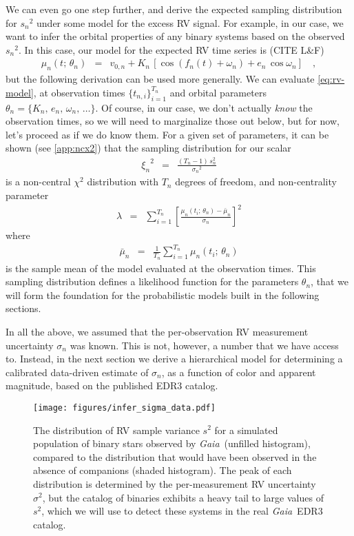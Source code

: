 \documentclass[modern, letterpaper]{aastex631}
\newcommand{\project}[1]{\textsl{#1}}
\newcommand{\Gaia}{\project{Gaia}}
\begin{document}
We can even go one step further, and derive the expected sampling distribution for ${s_n}^2$ under some model for the excess RV signal.
For example, in our case, we want to infer the orbital properties of any binary systems based on the observed ${s_n}^2$.
In this case, our model for the expected RV time series is (CITE L\&F)
\begin{eqnarray}
	\mu_n(t;\,\theta_n) &=& v_{0,n} + K_n\,\left[\cos(f_n(t) + \omega_n) + e_n\,\cos \omega_n\right] \quad,
	\label{eq:rv-model}
\end{eqnarray}
but the following derivation can be used more generally.
We can evaluate \autoref{eq:rv-model}, at observation times $\{t_{n,i}\}_{i=1}^{T_n}$ and orbital parameters $\theta_n=\{K_n,\,e_n,\,\omega_n,\,\ldots\}$.
Of course, in our case, we don't actually \emph{know} the observation times, so we will need to marginalize those out below, but for now, let's proceed as if we do know them.
For a given set of parameters, it can be shown (see \autoref{app:ncx2}) that the sampling distribution for our scalar
\begin{eqnarray}
	{\xi_n}^2 &=& \frac{(T_n - 1)\,s_n^2}{{\sigma_n}^2}
	\label{eq:chi-sq-samp2}
\end{eqnarray}
is a non-central $\chi^2$ distribution with $T_n$ degrees of freedom, and non-centrality parameter
\begin{eqnarray}
	\lambda &=& \sum_{i=1}^{T_n} \left[\frac{\mu_n(t_i;\,\theta_n) - \bar{\mu}_n}{\sigma_n}\right]^2
	\label{eq:ncx2-nc-param}
\end{eqnarray}
where
\begin{eqnarray}
	\bar{\mu}_n &=& \frac{1}{T_n}\sum_{i=1}^{T_n} \mu_n(t_i;\,\theta_n)
\end{eqnarray}
is the sample mean of the model evaluated at the observation times.
This sampling distribution defines a likelihood function for the parameters $\theta_n$, that we will form the foundation for the probabilistic models built in the following sections.

In all the above, we assumed that the per-observation RV measurement uncertainty $\sigma_n$ was known.
This is not, however, a number that we have access to.
Instead, in the next section we derive a hierarchical model for determining a calibrated data-driven estimate of $\sigma_n$, as a function of color and apparent magnitude, based on the published EDR3 catalog.

\begin{figure}
	\begin{centering}
		\texttt{[image: figures/infer\_sigma\_data.pdf]}
		\caption{The distribution of RV sample variance ${s}^2$ for a simulated population of binary stars observed by \Gaia\ (unfilled histogram), compared to the distribution that would have been observed in the absence of companions (shaded histogram).
			The peak of each distribution is determined by the per-measurement RV uncertainty $\sigma^2$, but the catalog of binaries exhibits a heavy tail to large values of $s^2$, which we will use to detect these systems in the real \Gaia\ EDR3 catalog.}
		\label{fig:infer_sigma:data}
	\end{centering}
\end{figure}
\end{document}
